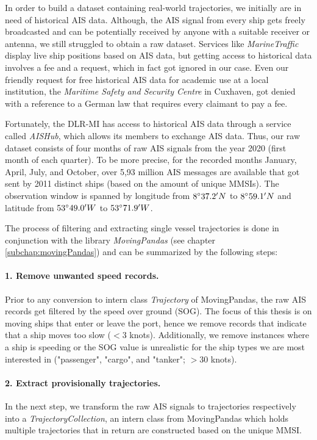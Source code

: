 In order to build a dataset containing real-world trajectories, we initially are in need of historical AIS data. Although, the AIS signal from every ship gets freely broadcasted and can be potentially received by anyone with a suitable receiver or antenna, we still struggled to obtain a raw dataset. Services like \textit{MarineTraffic} display live ship positions based on AIS data, but getting access to historical data involves a fee and a request, which in fact got ignored in our case. Even our friendly request for free historical AIS data for academic use at a local institution, the \textit{Maritime Safety and Security Centre} in Cuxhaven, got denied with a reference to a German law that requires every claimant to pay a fee.
\par
Fortunately, the DLR-MI has access to historical AIS data through a service called \textit{AISHub}, which allows its members to exchange AIS data. Thus, our raw dataset consists of four months of raw AIS signals from the year 2020 (first month of each quarter). To be more precise, for the recorded months January, April, July, and  October, over 5,93 million AIS messages are available that got sent by 2011 distinct ships (based on the amount of unique MMSIs). The observation window is spanned by longitude from $8\degree37.2'N$ to $8\degree59.1'N$ and latitude from $53\degree49.0'W$ to $53\degree71.9'W$.
\par
The process of filtering and extracting single vessel trajectories is done  in  conjunction  with  the  library \textit{MovingPandas} (see chapter \ref{subchap:movingPandas}) and can be summarized by the following steps:
\paragraph{1. Remove unwanted speed records.}
Prior to any conversion to intern class \textit{Trajectory} of MovingPandas, the raw AIS records get filtered by the speed over ground (SOG). The focus of this thesis is on moving ships that enter or leave the port, hence we remove records that indicate that a ship moves too slow ($<3$ knots). Additionally, we remove instances where a ship is speeding or the SOG value is unrealistic for the ship types we are most interested in ("passenger", "cargo", and "tanker"; $>30$ knots).


\paragraph{2. Extract provisionally trajectories.}
In the next step, we transform the raw AIS signals to trajectories respectively into a \textit{TrajectoryCollection}, an intern class from MovingPandas which holds multiple trajectories that in return are constructed based on the unique MMSI. 


